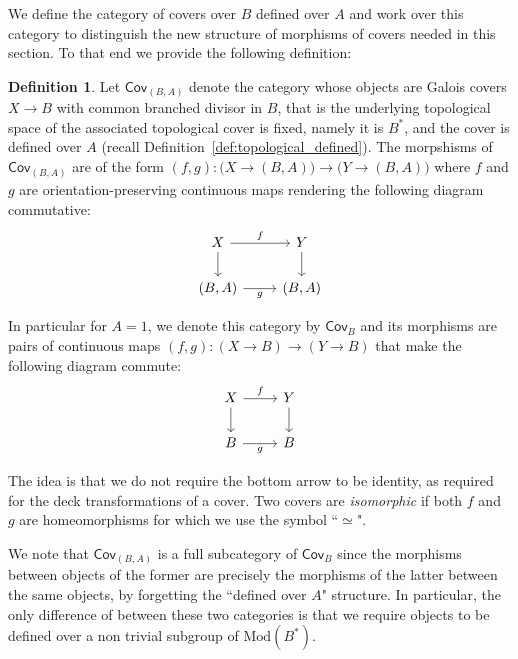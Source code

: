 \documentclass[10pt]{amsart}
\theoremstyle{definition}
\newtheorem{definition}[theorem]{Definition}
\begin{document}
We define the category of covers over $B$ defined over $A$ and work over this category to distinguish the new structure of morphisms of covers needed in this section. To that end we provide the following definition:

\begin{definition}\label{def:category of covers}
Let $\mathsf{Cov}_{(B,A)}$ denote the category whose objects are Galois covers $X\rightarrow B$ with common branched divisor in $B$, that is the underlying topological space of the associated topological cover is fixed, namely it is $B^*$, and the cover is defined over $A$ (recall Definition~\ref{def:topological_defined}). The morpshisms of $\mathsf{Cov}_{(B,A)}$ are of the form $(f,g) \colon \big( X \to (B,A) \big) \xrightarrow[]{} \big( Y \to (B,A) \big)$ where $f$ and $g$ are orientation-preserving continuous maps rendering the following diagram commutative:
\begin{equation*}
    \begin{tikzcd}
        X \arrow[r, "f"] \arrow[d] & Y \arrow[d] \\
        (B,A) \arrow[r, "g"'] & (B,A)
    \end{tikzcd}
\end{equation*}

In particular for $A=1$, we denote this category by $\mathsf{Cov}_{B}$ and its morphisms are pairs of continuous maps $(f,g)\colon (X \to B) \to (Y \to B)$ that make the following diagram commute:
\begin{equation*}
    \begin{tikzcd}
        X \arrow[r, "f"] \arrow[d] & Y \arrow[d] \\
        B \arrow[r, "g"'] & B
    \end{tikzcd}
\end{equation*}
\end{definition}

The idea is that we do not require the bottom arrow to be identity, as required for the deck transformations of a cover. Two covers are {\em isomorphic} if both $f$ and $g$ are homeomorphisms for which we use the symbol “$\simeq $".

We note that $\mathsf{Cov}_{(B,A)}$ is a full subcategory of $\mathsf{Cov}_B$ since the morphisms between objects of the former are precisely the morphisms of the latter between the same objects, by forgetting the “defined over $A$" structure. In particular, the only difference of between these two categories is that we require objects to be defined over a non trivial subgroup of $\mathrm{Mod}(B^*)$.
\end{document}
